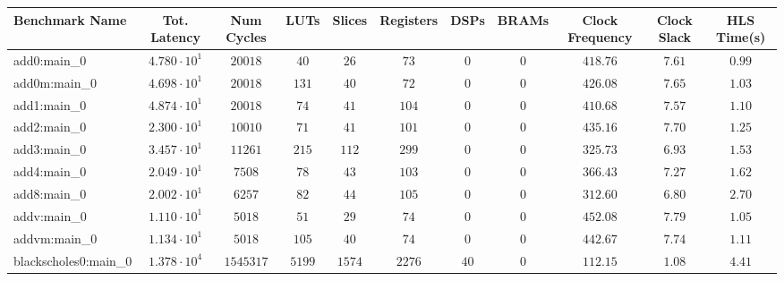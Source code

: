 \begin{tabular}{|l|c|c|c|c|c|c|c|c|c|c|}
\hline
Benchmark Name                 & Tot. Latency           & Num Cycles   & LUTs       & Slices     & Registers  & DSPs     & BRAMs    & Clock Frequency & Clock Slack & HLS Time(s) \\
\hline
add0:main\_0                   & $ 4.780 \cdot 10^{1} $ & $ 20018    $ & $ 40     $ & $ 26     $ & $ 73     $ & $ 0    $ & $ 0    $ & $ 418.76      $ & $ 7.61    $ & $ 0.99    $ \\
add0m:main\_0                  & $ 4.698 \cdot 10^{1} $ & $ 20018    $ & $ 131    $ & $ 40     $ & $ 72     $ & $ 0    $ & $ 0    $ & $ 426.08      $ & $ 7.65    $ & $ 1.03    $ \\
add1:main\_0                   & $ 4.874 \cdot 10^{1} $ & $ 20018    $ & $ 74     $ & $ 41     $ & $ 104    $ & $ 0    $ & $ 0    $ & $ 410.68      $ & $ 7.57    $ & $ 1.10    $ \\
add2:main\_0                   & $ 2.300 \cdot 10^{1} $ & $ 10010    $ & $ 71     $ & $ 41     $ & $ 101    $ & $ 0    $ & $ 0    $ & $ 435.16      $ & $ 7.70    $ & $ 1.25    $ \\
add3:main\_0                   & $ 3.457 \cdot 10^{1} $ & $ 11261    $ & $ 215    $ & $ 112    $ & $ 299    $ & $ 0    $ & $ 0    $ & $ 325.73      $ & $ 6.93    $ & $ 1.53    $ \\
add4:main\_0                   & $ 2.049 \cdot 10^{1} $ & $ 7508     $ & $ 78     $ & $ 43     $ & $ 103    $ & $ 0    $ & $ 0    $ & $ 366.43      $ & $ 7.27    $ & $ 1.62    $ \\
add8:main\_0                   & $ 2.002 \cdot 10^{1} $ & $ 6257     $ & $ 82     $ & $ 44     $ & $ 105    $ & $ 0    $ & $ 0    $ & $ 312.60      $ & $ 6.80    $ & $ 2.70    $ \\
addv:main\_0                   & $ 1.110 \cdot 10^{1} $ & $ 5018     $ & $ 51     $ & $ 29     $ & $ 74     $ & $ 0    $ & $ 0    $ & $ 452.08      $ & $ 7.79    $ & $ 1.05    $ \\
addvm:main\_0                  & $ 1.134 \cdot 10^{1} $ & $ 5018     $ & $ 105    $ & $ 40     $ & $ 74     $ & $ 0    $ & $ 0    $ & $ 442.67      $ & $ 7.74    $ & $ 1.11    $ \\
blackscholes0:main\_0          & $ 1.378 \cdot 10^{4} $ & $ 1545317  $ & $ 5199   $ & $ 1574   $ & $ 2276   $ & $ 40   $ & $ 0    $ & $ 112.15      $ & $ 1.08    $ & $ 4.41    $ \\

\end{tabular}
